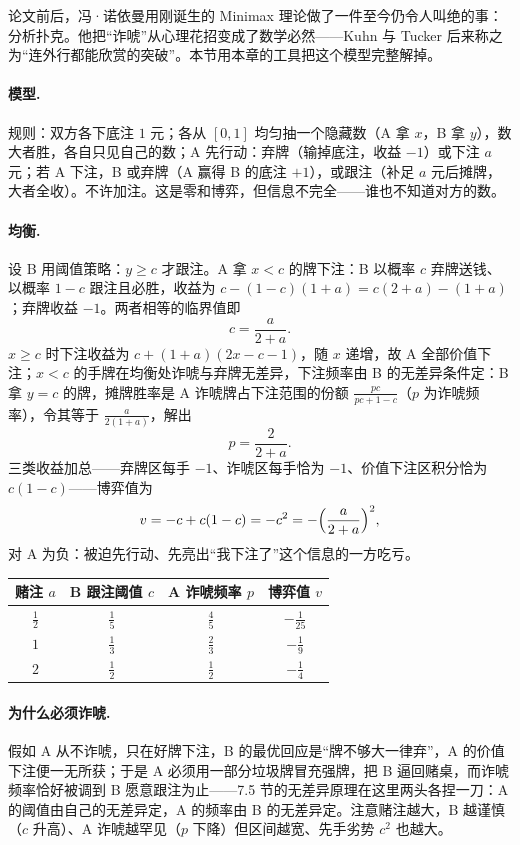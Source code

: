 论文前后，冯·诺依曼用刚诞生的 Minimax 理论做了一件至今仍令人叫绝的事：分析扑克。他把“诈唬”从心理花招变成了数学必然——Kuhn 与 Tucker 后来称之为“连外行都能欣赏的突破”。本节用本章的工具把这个模型完整解掉。

\paragraph{模型.} 规则：双方各下底注 $1$ 元；各从 $[0,1]$ 均匀抽一个隐藏数（A 拿 $x$，B 拿 $y$），数大者胜，各自只见自己的数；A 先行动：弃牌（输掉底注，收益 $-1$）或下注 $a$ 元；若 A 下注，B 或弃牌（A 赢得 B 的底注 $+1$），或跟注（补足 $a$ 元后摊牌，大者全收）。不许加注。这是零和博弈，但信息不完全——谁也不知道对方的数。

\paragraph{均衡.} 设 B 用阈值策略：$y\ge c$ 才跟注。A 拿 $x<c$ 的牌下注：B 以概率 $c$ 弃牌送钱、以概率 $1-c$ 跟注且必胜，收益为 $c-(1-c)(1+a)=c(2+a)-(1+a)$；弃牌收益 $-1$。两者相等的临界值即
\[
 c=\frac{a}{2+a}.
\]
$x\ge c$ 时下注收益为 $c+(1+a)(2x-c-1)$，随 $x$ 递增，故 A 全部价值下注；$x<c$ 的手牌在均衡处诈唬与弃牌无差异，下注频率由 B 的无差异条件定：B 拿 $y=c$ 的牌，摊牌胜率是 A 诈唬牌占下注范围的份额 $\tfrac{pc}{pc+1-c}$（$p$ 为诈唬频率），令其等于 $\tfrac{a}{2(1+a)}$，解出
\[
 p=\frac{2}{2+a}.
\]
三类收益加总——弃牌区每手 $-1$、诈唬区每手恰为 $-1$、价值下注区积分恰为 $c(1-c)$——博弈值为
\[
 v=-c+c(1-c)=-c^{2}=-\Bigl(\frac{a}{2+a}\Bigr)^{2},
\]
对 A 为负：被迫先行动、先亮出“我下注了”这个信息的一方吃亏。

\begin{center}
\begin{tabular}{cccc}
\toprule
赌注 $a$ & B 跟注阈值 $c$ & A 诈唬频率 $p$ & 博弈值 $v$\\
\midrule
$\tfrac12$ & $\tfrac15$ & $\tfrac45$ & $-\tfrac1{25}$\\
$1$ & $\tfrac13$ & $\tfrac23$ & $-\tfrac19$\\
$2$ & $\tfrac12$ & $\tfrac12$ & $-\tfrac14$\\
\bottomrule
\end{tabular}
\end{center}

\paragraph{为什么必须诈唬.} 假如 A 从不诈唬，只在好牌下注，B 的最优回应是“牌不够大一律弃”，A 的价值下注便一无所获；于是 A 必须用一部分垃圾牌冒充强牌，把 B 逼回赌桌，而诈唬频率恰好被调到 B 愿意跟注为止——7.5 节的无差异原理在这里两头各捏一刀：A 的阈值由自己的无差异定，A 的频率由 B 的无差异定。注意赌注越大，B 越谨慎（$c$ 升高）、A 诈唬越罕见（$p$ 下降）但区间越宽、先手劣势 $c^{2}$ 也越大。

